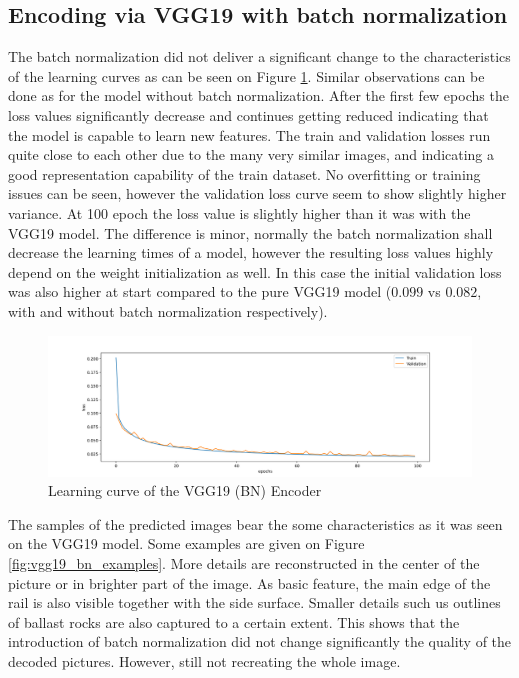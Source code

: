 \subsection{Encoding via VGG19 with batch normalization}
The batch normalization did not deliver a significant change to the characteristics of the learning
curves as can be seen on Figure \ref{fig:vgg19_bn_learning_curve}.
Similar observations can be done as for the model without batch normalization.
After the first few epochs the loss values significantly decrease and continues getting reduced
indicating that the model is capable to learn new features.
The train and validation losses run quite close to each other due to the many very similar images,
and indicating a good representation capability of the train dataset.
No overfitting or training issues can be seen, however the validation loss curve seem to show
slightly higher variance.
At 100 epoch the loss value is slightly higher than it was with the VGG19 model.
The difference is minor, normally the batch normalization shall decrease the learning times of a model,
however the resulting loss values highly depend on the weight initialization as well.
In this case the initial validation loss was also higher at start compared to the pure VGG19 model
($0.099$ vs $0.082$, with and without batch normalization respectively).

\begin{figure}[H]
    \centering
    \includegraphics[width=\textwidth,trim={0 0 0 1cm},clip]{./results/vgg19_bn_vgg19/20230525_045131_results.png}
    \caption{Learning curve of the VGG19 (BN) Encoder}
    \label{fig:vgg19_bn_learning_curve}
\end{figure}

The samples of the predicted images bear the some characteristics as it was seen on the VGG19 model.
Some examples are given on Figure \ref{fig:vgg19_bn_examples}.
More details are reconstructed in the center of the picture or in brighter part of the image.
As basic feature, the main edge of the rail is also visible together with the side surface.
Smaller details such us outlines of ballast rocks are also captured to a certain extent.
This shows that the introduction of batch normalization did not change significantly the quality of
the decoded pictures.
However, still not recreating the whole image.

